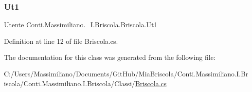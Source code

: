 \subsubsection{\texorpdfstring{Ut1}{Ut1}}
{\footnotesize\ttfamily \hyperlink{class_conti_1_1_massimiliano_1_1__5_i_1_1_briscola_1_1_utente}{Utente} Conti.\+Massimiliano.\+\_\+I.\+Briscola.\+Briscola.\+Ut1\hspace{0.3cm}{\ttfamily [get]}}



Definition at line 12 of file Briscola.\+cs.



The documentation for this class was generated from the following file\+:\begin{DoxyCompactItemize}
\item 
C\+:/\+Users/\+Massimiliano/\+Documents/\+Git\+Hub/\+Mia\+Briscola/\+Conti.\+Massimiliano.\+I.\+Briscola/\+Conti.\+Massimiliano.\+I.\+Briscola/\+Classi/\hyperlink{_briscola_8cs}{Briscola.\+cs}\end{DoxyCompactItemize}
